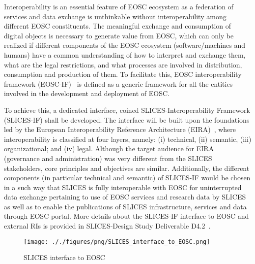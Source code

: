 Interoperability is an essential feature of EOSC ecosystem as a federation of services and data exchange is unthinkable without interoperability among different EOSC constituents. The meaningful exchange and consumption of digital objects is necessary to generate value from EOSC, which can only be realized if different components of the EOSC ecosystem (software/machines and humans) have a common understanding of how to interpret and exchange them, what are the legal restrictions, and what processes are involved in distribution, consumption and production of them. To facilitate this, EOSC interoperability framework (EOSC-IF)~\cite{eosc-if} is defined as a generic framework for all the entities involved in the development and deployment of EOSC.

To achieve this, a dedicated interface, coined SLICES-Interoperability Framework (SLICES-IF) shall be developed. The interface will be built upon the foundations led by the European Interoperability Reference Architecture (EIRA)~\cite{eira}, where interoperability is classified at four layers, namely: (i) technical, (ii) semantic, (iii) organizational; and (iv) legal. Although the target audience for EIRA (governance and administration) was very different from the SLICES stakeholders, core principles and objectives are similar. Additionally, the different components (in particular technical and semantic) of SLICES-IF would be chosen in a such way that SLICES is fully interoperable with EOSC for uninterrupted data exchange pertaining to use of EOSC services and research data by SLICES as well as to enable the publications of SLICES infrastructure, services and data through EOSC portal. More details about the SLICES-IF interface to EOSC and external RIs is provided in SLICES-Design Study Deliverable D4.2~\cite{slices-ds-d4.2}.

\begin{figure*}[t]
    \centering
    \texttt{[image: ././figures/png/SLICES\_interface\_to\_EOSC.png]}
	\caption{SLICES interface to EOSC}
	\label{fig:SLICES-interface-to-EOSC}
\end{figure*}
